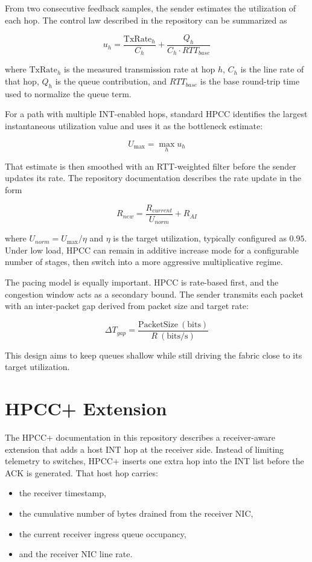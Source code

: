 \documentclass[11pt,a4paper]{article}
\begin{document}
From two consecutive feedback samples, the sender estimates the utilization of each hop. The control law described in the repository can be summarized as

\[
u_h = \frac{\mathrm{TxRate}_h}{C_h} + \frac{Q_h}{C_h \cdot RTT_{base}}
\]

where $\mathrm{TxRate}_h$ is the measured transmission rate at hop $h$, $C_h$ is the line rate of that hop, $Q_h$ is the queue contribution, and $RTT_{base}$ is the base round-trip time used to normalize the queue term.

For a path with multiple INT-enabled hops, standard HPCC identifies the largest instantaneous utilization value and uses it as the bottleneck estimate:

\[
U_{\max} = \max_h u_h
\]

That estimate is then smoothed with an RTT-weighted filter before the sender updates its rate. The repository documentation describes the rate update in the form

\[
R_{new} = \frac{R_{current}}{U_{norm}} + R_{AI}
\]

where $U_{norm} = U_{\max}/\eta$ and $\eta$ is the target utilization, typically configured as $0.95$. Under low load, HPCC can remain in additive increase mode for a configurable number of stages, then switch into a more aggressive multiplicative regime.

The pacing model is equally important. HPCC is rate-based first, and the congestion window acts as a secondary bound. The sender transmits each packet with an inter-packet gap derived from packet size and target rate:

\[
\Delta T_{gap} = \frac{\mathrm{PacketSize\ (bits)}}{R\ \mathrm{(bits/s)}}
\]

This design aims to keep queues shallow while still driving the fabric close to its target utilization.

\section{HPCC+ Extension}

The HPCC+ documentation in this repository describes a receiver-aware extension that adds a host INT hop at the receiver side. Instead of limiting telemetry to switches, HPCC+ inserts one extra hop into the INT list before the ACK is generated. That host hop carries:

\begin{itemize}
    \item the receiver timestamp,
    \item the cumulative number of bytes drained from the receiver NIC,
    \item the current receiver ingress queue occupancy,
    \item and the receiver NIC line rate.
\end{itemize}
\end{document}
